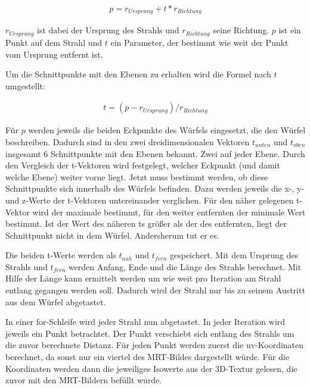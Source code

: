\begin{align}
p=r_{Ursprung}+t*r_{Richtung}
\end{align}

$r_{Ursprung}$ ist dabei der Ursprung des Strahls und $r_{Richtung}$ seine Richtung. $p$ ist ein Punkt auf dem Strahl und $t$ ein Parameter, der bestimmt wie weit der Punkt vom Ursprung entfernt ist.

Um die Schnittpunkte mit den Ebenen zu erhalten wird die Formel nach $t$ umgestellt:

\begin{align}
t=(p-r_{Ursprung})/r_{Richtung}
\end{align}

Für $p$ werden jeweils die beiden Eckpunkte des Würfels eingesetzt, die den Würfel beschreiben. Dadurch sind in den zwei dreidimensionalen Vektoren $t_{unten}$ und $t_{oben}$ insgesamt 6 Schnittpunkte mit den Ebenen bekannt. Zwei auf jeder Ebene. Durch den Vergleich der t-Vektoren wird festgelegt, welcher Eckpunkt (und damit welche Ebene) weiter vorne liegt. 
Jetzt muss bestimmt werden, ob diese Schnittpunkte sich innerhalb des Würfels befinden.
Dazu werden jeweils die x-, y- und z-Werte der t-Vektoren untereinander verglichen. Für den näher gelegenen t-Vektor wird der maximale bestimmt, für den weiter entfernten der minimale Wert bestimmt. Ist der Wert des näheren ts größer als der des entfernten, liegt der Schnittpunkt nicht in dem Würfel. Andersherum tut er es.

Die beiden t-Werte werden als $t_{nah}$ und $t_{fern}$ gespeichert.
Mit dem Ursprung des Strahls und $t_{fern}$ werden Anfang, Ende und die Länge des Strahls berechnet. Mit Hilfe der Länge kann ermittelt werden um wie weit pro Iteration am Strahl entlang gegangen werden soll. Dadurch wird der Strahl nur bis zu seinem Austritt aus dem Würfel abgetastet. 

In einer for-Schleife wird jeder Strahl nun abgetastet. In jeder Iteration wird jeweils ein Punkt betrachtet. Der Punkt verschiebt sich entlang des Strahls um die zuvor berechnete Distanz.
Für jeden Punkt werden zuerst die uv-Koordinaten berechnet, da sonst nur ein viertel des MRT-Bildes dargestellt würde.
Für die Koordinaten werden dann die jeweiliges Isowerte aus der 3D-Textur gelesen, die zuvor mit den MRT-Bildern befüllt wurde.

